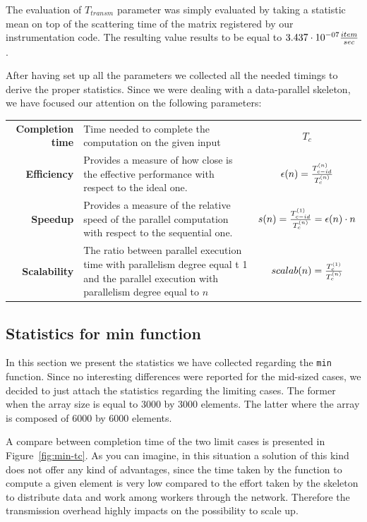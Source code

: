 The evaluation of $T_{transm}$ parameter was simply evaluated by taking
a statistic mean on top of the scattering time of the matrix registered
by our instrumentation code. The resulting value results to be equal to
$3.437\cdot 10^{-07} {item \over sec}$.

After having set up all the parameters we collected all the needed
timings to derive the proper statistics. Since we were dealing with
a data-parallel skeleton, we have focused our attention on the following
parameters:\\

\begin{tabular}{r | p{}| c}
  \textbf{Completion time} & Time needed to complete the computation on
  the given input & $T_c$ \\

  \textbf{Efficiency}      & Provides a measure of how close is the
  effective performance with respect to the ideal one. & $
  \epsilon(n) = {T_{c-id}^{(n)} \over T_{c}^{(n)}}$ \\

  \textbf{Speedup}         & Provides a measure of the relative speed of
  the parallel computation with respect to the sequential one. & $ s(n) =
  {T_{c-id}^{(1)} \over T_{c}^{(n)}} = \epsilon(n) \cdot n$ \\

  \textbf{Scalability}     & The ratio between parallel execution time
  with parallelism degree equal t 1 and the parallel execution with
  parallelism degree equal to $n$ & $scalab(n) = {T_{c}^{(1)} \over
  T_{c}^{(n)}}$
\end{tabular}

\subsection{Statistics for min function}

In this section we present the statistics we have collected regarding
the \texttt{min} function. Since no interesting differences were
reported for the mid-sized cases, we decided to just attach the
statistics regarding the limiting cases. The former when the array size
is equal to 3000 by 3000 elements. The latter where the array is
composed of 6000 by 6000 elements.

A compare between completion time of the two limit cases is presented in
Figure~\ref{fig:min-tc}. As you can imagine, in this situation a solution
of this kind does not offer any kind of advantages, since the time taken
by the function to compute a given element is very low compared to the
effort taken by the skeleton to distribute data and work among workers
through the network. Therefore the transmission overhead highly impacts
on the possibility to scale up.

